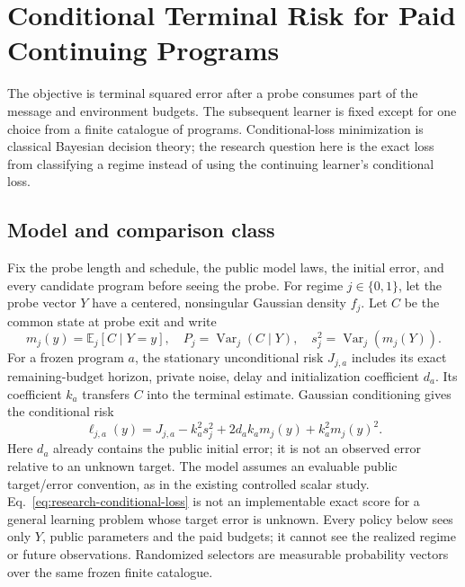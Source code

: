 \section{Conditional Terminal Risk for Paid Continuing Programs}
The objective is terminal squared error after a probe consumes part of the message and environment budgets.
The subsequent learner is fixed except for one choice from a finite catalogue of programs.
Conditional-loss minimization is classical Bayesian decision theory; the research question here is the exact loss from classifying a regime instead of using the continuing learner's conditional loss.

\subsection{Model and comparison class}
Fix the probe length and schedule, the public model laws, the initial error, and every candidate program before seeing the probe.
For regime $j\in\{0,1\}$, let the probe vector $Y$ have a centered, nonsingular Gaussian density $f_j$.
Let $C$ be the common state at probe exit and write
\[
m_j(y)=\mathbb E_j[C\mid Y=y],\quad
P_j=\operatorname{Var}_j(C\mid Y),\quad s_j^2=\operatorname{Var}_j(m_j(Y)).
\]
For a frozen program $a$, the stationary unconditional risk $J_{j,a}$ includes its exact remaining-budget horizon, private noise, delay and initialization coefficient $d_a$.
Its coefficient $k_a$ transfers $C$ into the terminal estimate.
Gaussian conditioning gives the conditional risk
\begin{equation}
\ell_{j,a}(y)=J_{j,a}-k_a^2s_j^2+2d_ak_am_j(y)+k_a^2m_j(y)^2.
\label{eq:research-conditional-loss}
\end{equation}
Here $d_a$ already contains the public initial error; it is not an observed error relative to an unknown target.
The model assumes an evaluable public target/error convention, as in the existing controlled scalar study.
Eq.~\eqref{eq:research-conditional-loss} is not an implementable exact score for a general learning problem whose target error is unknown.
Every policy below sees only $Y$, public parameters and the paid budgets; it cannot see the realized regime or future observations.
Randomized selectors are measurable probability vectors over the same frozen finite catalogue.

